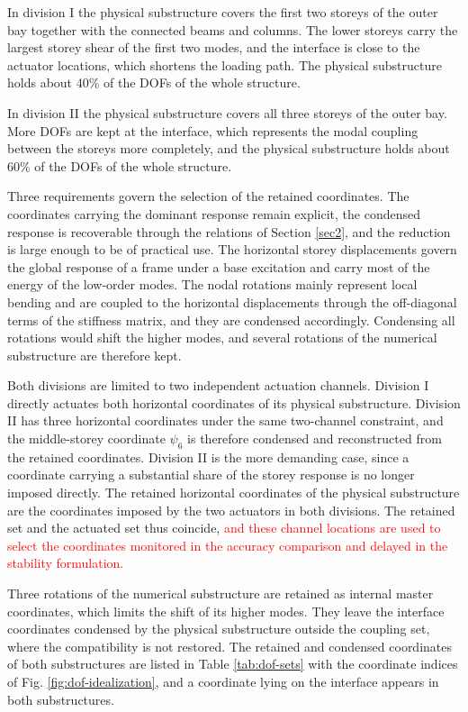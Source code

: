 \documentclass[a4paper,fleqn,review,12pt]{cas-sc}
\numberwithin{equation}{section}
\newcommand{\rev}[1]{\textcolor{red}{#1}}
\begin{document}
In division I the physical substructure covers the first two storeys of the outer bay together with the connected beams and columns. The lower storeys carry the largest storey shear of the first two modes, and the interface is close to the actuator locations, which shortens the loading path. The physical substructure holds about 40\% of the DOFs of the whole structure.

In division II the physical substructure covers all three storeys of the outer bay. More DOFs are kept at the interface, which represents the modal coupling between the storeys more completely, and the physical substructure holds about 60\% of the DOFs of the whole structure.

Three requirements govern the selection of the retained coordinates. The coordinates carrying the dominant response remain explicit, the condensed response is recoverable through the relations of Section \ref{sec2}, and the reduction is large enough to be of practical use. The horizontal storey displacements govern the global response of a frame under a base excitation and carry most of the energy of the low-order modes. The nodal rotations mainly represent local bending and are coupled to the horizontal displacements through the off-diagonal terms of the stiffness matrix, and they are condensed accordingly. Condensing all rotations would shift the higher modes, and several rotations of the numerical substructure are therefore kept.

Both divisions are limited to two independent actuation channels. Division I directly actuates both horizontal coordinates of its physical substructure. Division II has three horizontal coordinates under the same two-channel constraint, and the middle-storey coordinate \(\psi_{6}\) is therefore condensed and reconstructed from the retained coordinates. Division II is the more demanding case, since a coordinate carrying a substantial share of the storey response is no longer imposed directly. The retained horizontal coordinates of the physical substructure are the coordinates imposed by the two actuators in both divisions. The retained set and the actuated set thus coincide, \rev{and these channel locations are used to select the coordinates monitored in the accuracy comparison and delayed in the stability formulation.}

Three rotations of the numerical substructure are retained as internal master coordinates, which limits the shift of its higher modes. They leave the interface coordinates condensed by the physical substructure outside the coupling set, where the compatibility is not restored. The retained and condensed coordinates of both substructures are listed in Table \ref{tab:dof-sets} with the coordinate indices of Fig. \ref{fig:dof-idealization}, and a coordinate lying on the interface appears in both substructures.
\end{document}
